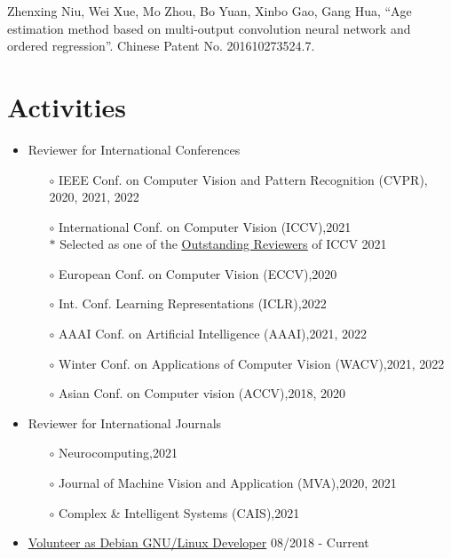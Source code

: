 \documentclass[margin,line,pifont,palatino,courier]{res}
\begin{document}
\begin{resume}
\begin{enumerate}[noitemsep, leftmargin=*, label={[P0{\arabic*}]}]
\item Zhenxing Niu, Wei Xue, Mo Zhou, Bo Yuan, Xinbo Gao, Gang Hua,
	``Age estimation method based on multi-output convolution neural
	network and ordered regression''. Chinese Patent No. 201610273524.7.

\end{enumerate}

\section{\sc Activities}

\begin{itemize}[noitemsep, leftmargin=*]
\item Reviewer for International Conferences
	\begin{itemize}[noitemsep, leftmargin=*]
		\item[$\circ$] IEEE Conf. on Computer Vision and Pattern Recognition (CVPR), \hfill 2020, 2021, 2022
		\item[$\circ$] International Conf. on Computer Vision (ICCV),\hfill 2021\\
			$\ast$ Selected as one of the \href{http://iccv2021.thecvf.com/outstanding-reviewers}{\underline{Outstanding Reviewers}} of ICCV 2021
		\item[$\circ$] European Conf. on Computer Vision (ECCV),\hfill 2020
		\item[$\circ$] Int. Conf. Learning Representations (ICLR),\hfill 2022
		\item[$\circ$] AAAI Conf. on Artificial Intelligence (AAAI),\hfill 2021, 2022
		\item[$\circ$] Winter Conf. on Applications of Computer Vision (WACV),\hfill 2021, 2022
		\item[$\circ$] Asian Conf. on Computer vision (ACCV),\hfill 2018, 2020
	\end{itemize}
\item Reviewer for International Journals
	\begin{itemize}[noitemsep, leftmargin=*]
		\item[$\circ$] Neurocomputing,\hfill 2021
		\item[$\circ$] Journal of Machine Vision and Application (MVA),\hfill 2020, 2021
		\item[$\circ$] Complex \& Intelligent Systems (CAIS),\hfill 2021
	\end{itemize}
\item \href{https://nm.debian.org/person/lumin/}{Volunteer as Debian GNU/Linux Developer}
	\hfill 08/2018 - Current\\
\end{itemize}


\end{resume}
\end{document}
